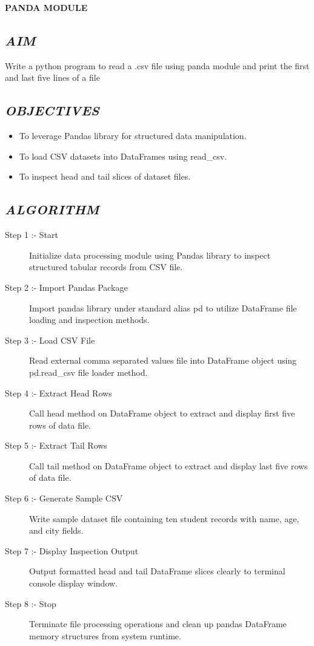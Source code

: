 \documentclass[11pt,a4paper]{article}
\begin{document}
\vspace{0.2cm}
\begin{center}
{\Huge \textbf{\textcolor{navyblue}{PANDA MODULE}}}
\end{center}
\vspace{0.3cm}

\subsection*{\textit{AIM}}
Write a python program to read a .csv file using panda module and print the first and last five lines of a file

\subsection*{\textit{OBJECTIVES}}
\begin{itemize}
  \item To leverage Pandas library for structured data manipulation.
  \item To load CSV datasets into DataFrames using read_csv.
  \item To inspect head and tail slices of dataset files.
\end{itemize}

\subsection*{\textit{ALGORITHM}}
\begin{description}
  \item[Step 1 :- Start] Initialize data processing module using Pandas library to inspect structured tabular records from CSV file.
  \item[Step 2 :- Import Pandas Package] Import pandas library under standard alias pd to utilize DataFrame file loading and inspection methods.
  \item[Step 3 :- Load CSV File] Read external comma separated values file into DataFrame object using pd.read_csv file loader method.
  \item[Step 4 :- Extract Head Rows] Call head method on DataFrame object to extract and display first five rows of data file.
  \item[Step 5 :- Extract Tail Rows] Call tail method on DataFrame object to extract and display last five rows of data file.
  \item[Step 6 :- Generate Sample CSV] Write sample dataset file containing ten student records with name, age, and city fields.
  \item[Step 7 :- Display Inspection Output] Output formatted head and tail DataFrame slices clearly to terminal console display window.
  \item[Step 8 :- Stop] Terminate file processing operations and clean up pandas DataFrame memory structures from system runtime.
\end{description}
\end{document}
